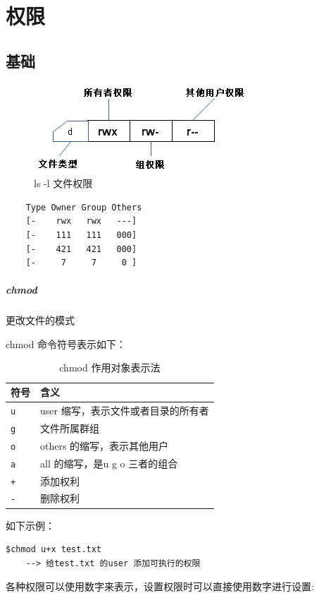 \documentclass[UTF8,a4paper,12pt]{ctexbook}
\begin{document}
	\section{权限}
		\subsection{基础}
		\begin{figure}[h]
			\centering
			\includegraphics[scale = 1]{figure/fileDescription.png}
			\caption{ls -l 文件权限}
		\end{figure}
		
		\begin{lstlisting}
	Type Owner Group Others
	[-    rwx   rwx   ---]
	[-    111   111   000]
	[-    421   421   000]
	[-     7     7     0 ]
		\end{lstlisting}
		 \subparagraph{chmod}更改文件的模式
		 
			 chmod 命令符号表示如下：
				\begin{table}[H]
					\centering
					\caption{chmod 作用对象表示法}
					\begin{tabular}{l|m{14cm}}
						\hline
						符号 	   	   & 含义\\
						\hline
						\verb|u |		& user 缩写，表示文件或者目录的所有者\\
						\verb|g	|		& 文件所属群组\\
						\verb|o	|		& others 的缩写，表示其他用户\\
						\verb|a	|		& all 的缩写，是u g o 三者的组合\\
						\verb|+ |		& 添加权利\\
						\verb|-	|		& 删除权利\\
						\hline
					\end{tabular}
				\end{table}	
			
			如下示例：	
			\begin{lstlisting}[frame=L,xleftmargin=.1\textwidth]
	$chmod u+x test.txt
	--> 给test.txt 的user 添加可执行的权限
			\end{lstlisting}
			
			各种权限可以使用数字来表示，设置权限时可以直接使用数字进行设置:
			
\end{document}
